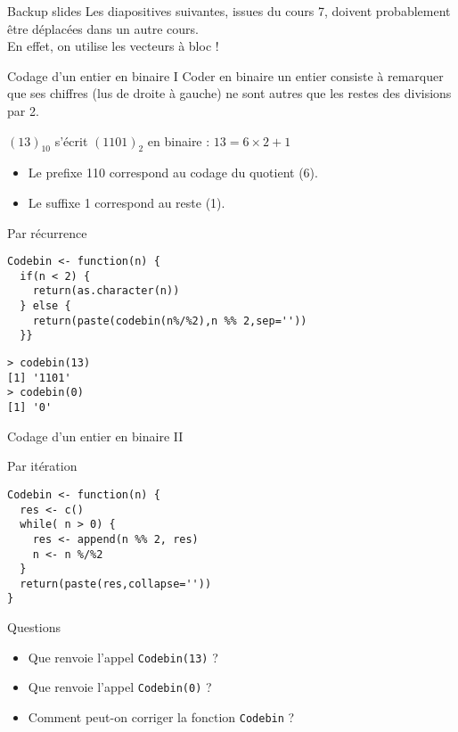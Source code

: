 \documentclass[10pt]{beamer}
\begin{document}
\begin{frame}[fragile]{Backup slides}
  Les diapositives suivantes, issues du cours 7, doivent probablement être déplacées dans un autre cours. \\
  En effet, on utilise les vecteurs à bloc !
\end{frame}


\begin{frame}[fragile]{Codage d'un entier en binaire I}
  Coder en binaire un entier consiste à remarquer que ses chiffres (lus de droite à gauche) ne sont autres que les restes des divisions par 2.
  \begin{exampleblock}{$(13)_{10}$ s'écrit $(1101)_2$ en binaire : $13 = 6 \times 2 + 1$}
    \begin{itemize}
    \item Le prefixe 110 correspond au codage du quotient (6).
    \item Le suffixe 1 correspond au reste (1).
    \end{itemize}
  \end{exampleblock}

  \begin{block}{Par récurrence}
    \begin{lstlisting}[style=edblock]
Codebin <- function(n) {
  if(n < 2) {
    return(as.character(n))
  } else {
    return(paste(codebin(n%/%2),n %% 2,sep=''))
  }}
    \end{lstlisting}
  \end{block}

  \begin{lstlisting}
> codebin(13)
[1] '1101'
> codebin(0)
[1] '0'
\end{lstlisting}


\end{frame}


\begin{frame}[fragile]{Codage d'un entier en binaire II}
  \begin{block}{Par itération}
    \begin{lstlisting}[style=edblock]
Codebin <- function(n) {
  res <- c()
  while( n > 0) {
    res <- append(n %% 2, res)
    n <- n %/%2
  }
  return(paste(res,collapse=''))
}
    \end{lstlisting}
  \end{block}

  \begin{exampleblock}{Questions}
    \begin{itemize}
    \item Que renvoie l'appel \texttt{Codebin(13)} ?
    \item Que renvoie l'appel \texttt{Codebin(0)} ?
    \item Comment peut-on corriger la fonction \texttt{Codebin} ?
    \end{itemize}
  \end{exampleblock}

\end{frame}
\end{document}
